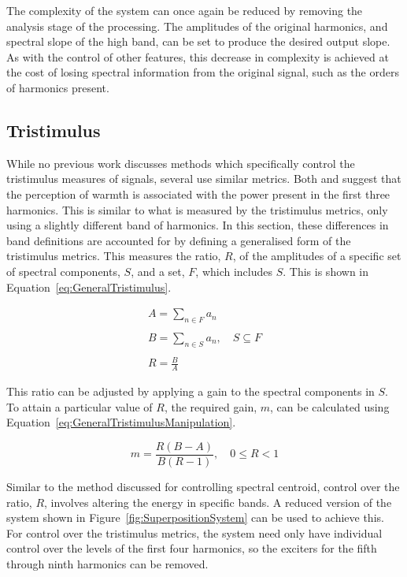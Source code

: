 		The complexity of the system can once again be reduced by removing the analysis stage of the processing.
		The amplitudes of the original harmonics, and spectral slope of the high band, can be set to produce the
		desired output slope. As with the control of other features, this decrease in complexity is achieved at the
		cost of losing spectral information from the original signal, such as the orders of harmonics present.

	\subsection{Tristimulus}
	\label{sec:FeatureControl-Parameterisation-Tristimulus}
		While no previous work discusses methods which specifically control the tristimulus measures of signals,
		several use similar metrics. Both \cite{williams2010perceptually} and \cite{zacharakis2011an} suggest that
		the perception of warmth is associated with the power present in the first three harmonics. This is similar
		to what is measured by the tristimulus metrics, only using a slightly different band of harmonics. In this
		section, these differences in band definitions are accounted for by defining a  generalised form of the
		tristimulus metrics. This measures the ratio, $R$, of the amplitudes of a specific set of spectral
		components, $S$, and a set, $F$, which includes $S$. This is shown in Equation~\ref{eq:GeneralTristimulus}.

		\begin{gather}
			A = \sum_{n \in F} a_{n} \nonumber \\
			\nonumber \\
			B = \sum_{n \in S} a_{n}, \quad S \subseteq F \nonumber \\
			\nonumber \\
			R = \frac{B}{A}
			\label{eq:GeneralTristimulus}
		\end{gather}

		This ratio can be adjusted by applying a gain to the spectral components in $S$. To attain a particular
		value of $R$, the required gain, $m$, can be calculated using
		Equation~\ref{eq:GeneralTristimulusManipulation}.

		\begin{equation}
			m = \frac{R(B - A)}{B(R - 1)}, \quad 0 \leq R < 1
			\label{eq:GeneralTristimulusManipulation}
		\end{equation}

		Similar to the method discussed for controlling spectral centroid, control over the ratio, $R$, involves
		altering the energy in specific bands. A reduced version of the system shown in
		Figure~\ref{fig:SuperpositionSystem} can be used to achieve this. For control over the tristimulus metrics,
		the system need only have individual control over the levels of the first four harmonics, so the exciters
		for the fifth through ninth harmonics can be removed.

